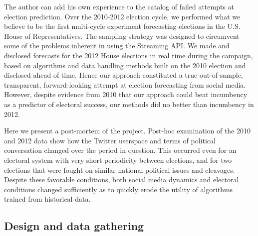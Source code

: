 \documentclass{article}
\begin{document}

The author can add his own experience to the catalog of failed
attempts at election prediction. Over the 2010-2012 election cycle, we
performed what we believe to be the first multi-cycle experiment
forecasting elections in the U.S. House of Representatives. The
sampling strategy was designed to circumvent some of the problems
inherent in using the Streaming API. We made and disclosed forecasts
for the 2012 House elections in real time during the campaign, based
on algorithms and data handling methods built on the 2010 election and
disclosed ahead of time. Hence our approach constituted a true
out-of-sample, transparent, forward-looking attempt at election
forecasting from social media. However, despite evidence from 2010
that our approach could beat incumbency as a predictor of electoral
success, our methods did no better than incumbency in 2012.

Here we present a post-mortem of the project. Post-hoc examination of
the 2010 and 2012 data show how the Twitter userspace and terms of
political conversation changed over the period in question. This
occurred even for an electoral system with very short periodicity
between elections, and for two elections that were fought on similar
national political issues and cleavages. Despite these favorable
conditions, both social media dynamics and electoral conditions
changed sufficiently as to quickly erode the utility of algorithms
trained from historical data. 

\subsection{Design and data gathering}
\label{sec:design-data-gath}
\end{document}
